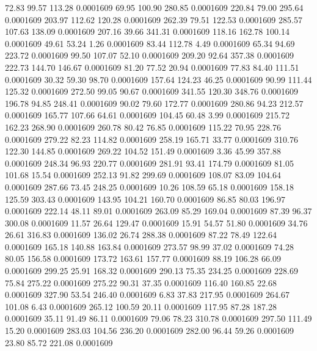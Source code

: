   72.83   99.57  113.28   0.0001609
  69.95  100.90  280.85   0.0001609
 220.84   79.00  295.64   0.0001609
 203.97  112.62  120.28   0.0001609
 262.39   79.51  122.53   0.0001609
 285.57  107.63  138.09   0.0001609
 207.16   39.66  341.31   0.0001609
 118.16  162.78  100.14   0.0001609
  49.61   53.24    1.26   0.0001609
  83.44  112.78    4.49   0.0001609
  65.34   94.69  223.72   0.0001609
  99.50  107.07   52.10   0.0001609
 209.20   92.64  357.38   0.0001609
 222.73  144.70  146.67   0.0001609
  81.20   77.52   20.94   0.0001609
  77.83   84.40  111.51   0.0001609
  30.32   59.30   98.70   0.0001609
 157.64  124.23   46.25   0.0001609
  90.99  111.44  125.32   0.0001609
 272.50   99.05   90.67   0.0001609
 341.55  120.30  348.76   0.0001609
 196.78   94.85  248.41   0.0001609
  90.02   79.60  172.77   0.0001609
 280.86   94.23  212.57   0.0001609
 165.77  107.66   64.61   0.0001609
 104.45   60.48    3.99   0.0001609
 215.72  162.23  268.90   0.0001609
 260.78   80.42   76.85   0.0001609
 115.22   70.95  228.76   0.0001609
 279.22   82.23  114.82   0.0001609
 258.19  165.71   33.77   0.0001609
 310.76  122.30  144.85   0.0001609
 269.22  104.52  151.49   0.0001609
   3.36   45.99  357.88   0.0001609
 248.34   96.93  220.77   0.0001609
 281.91   93.41  174.79   0.0001609
  81.05  101.68   15.54   0.0001609
 252.13   91.82  299.69   0.0001609
 108.07   83.09  104.64   0.0001609
 287.66   73.45  248.25   0.0001609
  10.26  108.59   65.18   0.0001609
 158.18  125.59  303.43   0.0001609
 143.95  104.21  160.70   0.0001609
  86.85   80.03  196.97   0.0001609
 222.14   48.11   89.01   0.0001609
 263.09   85.29  169.04   0.0001609
  87.39   96.37  300.08   0.0001609
  11.57   26.64  129.47   0.0001609
  15.91   54.57   51.80   0.0001609
  34.76   26.61  316.83   0.0001609
 136.02   26.74  288.38   0.0001609
  87.22   78.49  122.64   0.0001609
 165.18  140.88  163.84   0.0001609
 273.57   98.99   37.02   0.0001609
  74.28   80.05  156.58   0.0001609
 173.72  163.61  157.77   0.0001609
  88.19  106.28   66.09   0.0001609
 299.25   25.91  168.32   0.0001609
 290.13   75.35  234.25   0.0001609
 228.69   75.84  275.22   0.0001609
 275.22   90.31   37.35   0.0001609
 116.40  160.85   22.68   0.0001609
 327.90   53.54  246.40   0.0001609
   6.83   37.83  217.95   0.0001609
 264.67  101.08    6.43   0.0001609
 265.12  100.59   20.11   0.0001609
 117.95   87.28  187.28   0.0001609
  35.11   91.49   86.11   0.0001609
  79.06   78.23  310.78   0.0001609
 297.50  111.49   15.20   0.0001609
 283.03  104.56  236.20   0.0001609
 282.00   96.44   59.26   0.0001609
  23.80   85.72  221.08   0.0001609
